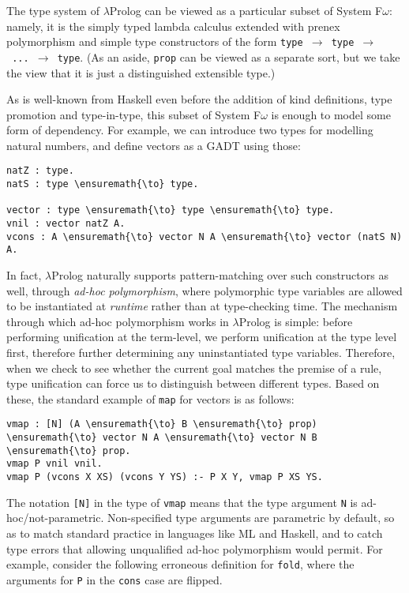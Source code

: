 The type system of \ensuremath{\lambda}Prolog can be viewed as a particular subset of
System F\ensuremath{\omega}: namely, it is the simply typed lambda calculus extended with
prenex polymorphism and simple type constructors of the form
\texttt{type\ \ensuremath{\to}\ type\ \ensuremath{\to}\ ...\ \ensuremath{\to}\ type}.
(As an aside, \texttt{prop} can be viewed as a separate sort, but we
take the view that it is just a distinguished extensible type.)

As is well-known from Haskell even before the addition of kind
definitions, type promotion and type-in-type, this subset of System F\ensuremath{\omega}
is enough to model some form of dependency. For example, we can
introduce two types for modelling natural numbers, and define vectors as
a GADT using those:

\begin{verbatim}
natZ : type.
natS : type \ensuremath{\to} type.

vector : type \ensuremath{\to} type \ensuremath{\to} type.
vnil : vector natZ A.
vcons : A \ensuremath{\to} vector N A \ensuremath{\to} vector (natS N) A.
\end{verbatim}

In fact, \ensuremath{\lambda}Prolog naturally supports pattern-matching over such
constructors as well, through \emph{ad-hoc polymorphism}, where
polymorphic type variables are allowed to be instantiated at
\emph{runtime} rather than at type-checking time. The mechanism through
which ad-hoc polymorphism works in \ensuremath{\lambda}Prolog is simple: before performing
unification at the term-level, we perform unification at the type level
first, therefore further determining any uninstantiated type variables.
Therefore, when we check to see whether the current goal matches the
premise of a rule, type unification can force us to distinguish between
different types. Based on these, the standard example of \texttt{map}
for vectors is as follows:

\begin{verbatim}
vmap : [N] (A \ensuremath{\to} B \ensuremath{\to} prop) \ensuremath{\to} vector N A \ensuremath{\to} vector N B \ensuremath{\to} prop.
vmap P vnil vnil.
vmap P (vcons X XS) (vcons Y YS) :- P X Y, vmap P XS YS.
\end{verbatim}

The notation \texttt{{[}N{]}} in the type of \texttt{vmap} means that
the type argument \texttt{N} is ad-hoc/not-parametric. Non-specified
type arguments are parametric by default, so as to match standard
practice in languages like ML and Haskell, and to catch type errors that
allowing unqualified ad-hoc polymorphism would permit. For example,
consider the following erroneous definition for \texttt{fold}, where the
arguments for \texttt{P} in the \texttt{cons} case are flipped.

